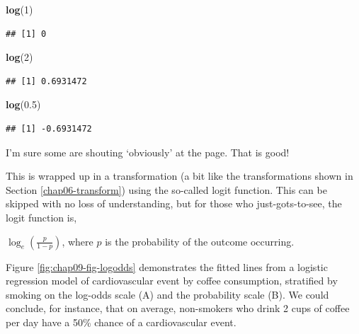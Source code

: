 \documentclass[
  12pt,
  krantz2]{krantz}
\makeatletter
\newenvironment{Shaded}{\begin{snugshade}}{\end{snugshade}}
\newcommand{\DecValTok}[1]{\textcolor[rgb]{0.00,0.00,0.81}{#1}}
\newcommand{\FloatTok}[1]{\textcolor[rgb]{0.00,0.00,0.81}{#1}}
\newcommand{\KeywordTok}[1]{\textcolor[rgb]{0.13,0.29,0.53}{\textbf{#1}}}
\newcommand{\NormalTok}[1]{#1}
\newenvironment{kframe}{%
\medskip{}
\setlength{\fboxsep}{.8em}
 \def\at@end@of@kframe{}%
 \ifinner\ifhmode%
  \def\at@end@of@kframe{\end{minipage}}%
  \begin{minipage}{\columnwidth}%
 \fi\fi%
 \def\FrameCommand##1{\hskip\@totalleftmargin \hskip-\fboxsep
 \colorbox{shadecolor}{##1}\hskip-\fboxsep
     \hskip-\linewidth \hskip-\@totalleftmargin \hskip\columnwidth}%
 \MakeFramed {\advance\hsize-\width
   \@totalleftmargin\z@ \linewidth\hsize
   \@setminipage}}%
 {\par\unskip\endMakeFramed%
 \at@end@of@kframe}
\renewenvironment{Shaded}{\begin{kframe}}{\end{kframe}}
\makeatother
\begin{document}
\begin{Shaded}
\begin{Highlighting}[]
\KeywordTok{log}\NormalTok{(}\DecValTok{1}\NormalTok{)}
\end{Highlighting}
\end{Shaded}

\begin{verbatim}
## [1] 0
\end{verbatim}

\begin{Shaded}
\begin{Highlighting}[]
\KeywordTok{log}\NormalTok{(}\DecValTok{2}\NormalTok{)}
\end{Highlighting}
\end{Shaded}

\begin{verbatim}
## [1] 0.6931472
\end{verbatim}

\begin{Shaded}
\begin{Highlighting}[]
\KeywordTok{log}\NormalTok{(}\FloatTok{0.5}\NormalTok{)}
\end{Highlighting}
\end{Shaded}

\begin{verbatim}
## [1] -0.6931472
\end{verbatim}

I'm sure some are shouting `obviously' at the page.
That is good!

This is wrapped up in a transformation (a bit like the transformations shown in Section \ref{chap06-transform}) using the so-called logit function.
This can be skipped with no loss of understanding, but for those who just-gots-to-see, the logit function is,

\(\log_e (\frac{p}{1-p})\), where \(p\) is the probability of the outcome occurring.

Figure \ref{fig:chap09-fig-logodds} demonstrates the fitted lines from a logistic regression model of cardiovascular event by coffee consumption, stratified by smoking on the log-odds scale (A) and the probability scale (B).
We could conclude, for instance, that on average, non-smokers who drink 2 cups of coffee per day have a 50\% chance of a cardiovascular event.
\end{document}
